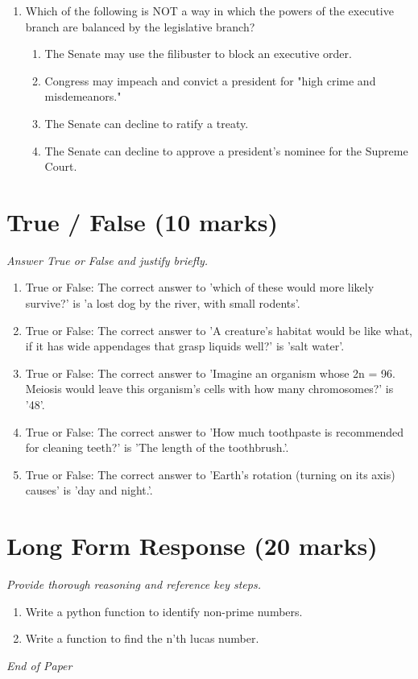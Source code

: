 \documentclass[12pt]{article}
\begin{document}
\begin{enumerate}[label=\arabic*.]
\begin{enumerate}[label=(\alph*)]
    \item salt added to water
\end{enumerate}
\item Which of the following is NOT a way in which the powers of the executive branch are balanced by the legislative branch?
\begin{enumerate}[label=(\alph*)]
    \item The Senate may use the filibuster to block an executive order.
    \item Congress may impeach and convict a president for "high crime and misdemeanors."
    \item The Senate can decline to ratify a treaty.
    \item The Senate can decline to approve a president's nominee for the Supreme Court.
\end{enumerate}
\end{enumerate}

\section*{True / False (10 marks)}
\textit{Answer True or False and justify briefly.}
\begin{enumerate}[label=\arabic*.]
\item True or False: The correct answer to 'which of these would more likely survive?' is 'a lost dog by the river, with small rodents'.
\item True or False: The correct answer to 'A creature's habitat would be like what, if it has wide appendages that grasp liquids well?' is 'salt water'.
\item True or False: The correct answer to 'Imagine an organism whose 2n = 96. Meiosis would leave this organism's cells with how many chromosomes?' is '48'.
\item True or False: The correct answer to 'How much toothpaste is recommended for cleaning teeth?' is 'The length of the toothbrush.'.
\item True or False: The correct answer to 'Earth's rotation (turning on its axis) causes' is 'day and night.'.
\end{enumerate}

\section*{Long Form Response (20 marks)}
\textit{Provide thorough reasoning and reference key steps.}
\begin{enumerate}[label=\arabic*.]
\item Write a python function to identify non-prime numbers.
\item Write a function to find the n'th lucas number.
\end{enumerate}

\vfill
\noindent\textit{End of Paper}
\end{document}
